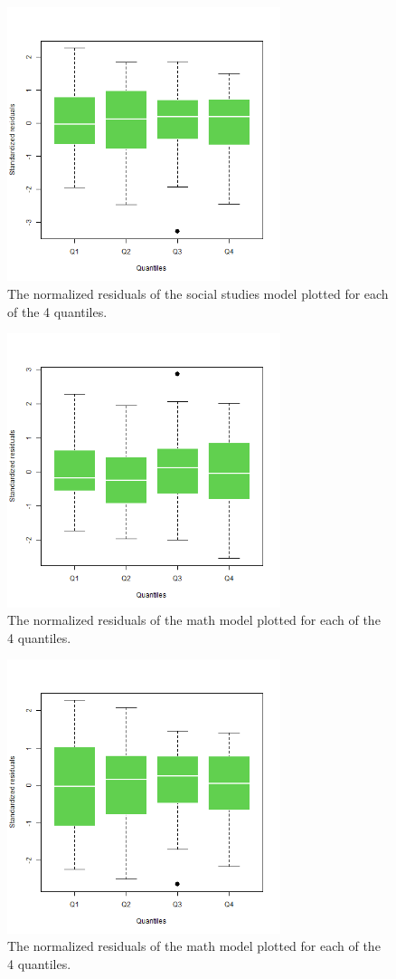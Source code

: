\documentclass[10pt, a4paper]{article}
\begin{document}
	\begin{figure}
		\includegraphics[width=8cm]{lm_socst_residual_boxplot.png}
		\centering
		\caption{The normalized residuals of the social studies model plotted for each of the 4 quantiles. }
		\label{fig::lm_socst_boxplot}
	\end{figure}

	\begin{figure}
		\includegraphics[width=8cm]{lm_math_nopeeking_residual_boxplot.png}
		\centering
		\caption{The normalized residuals of the math model plotted for each of the 4 quantiles. }
		\label{fig::lm_math_nopeeking_boxplot}
	\end{figure}

	\begin{figure}
		\includegraphics[width=8cm]{lm_socst_nopeeking_residual_boxplot.png}
		\centering
		\caption{The normalized residuals of the math model plotted for each of the 4 quantiles. }
		\label{fig::lm_socst_nopeeking_boxplot}
	\end{figure}
\end{document}
